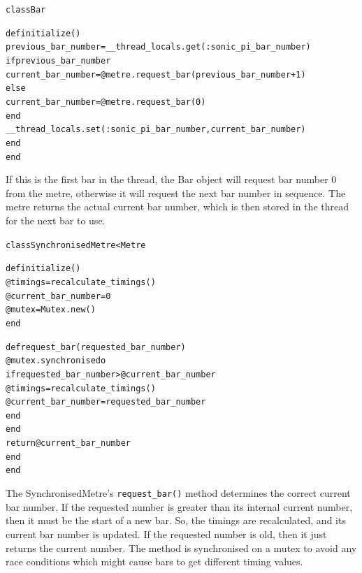 \documentclass[12pt,twoside,openright]{report}
\begin{document}
\begin{alltt}
class Bar

    def initialize()
        previous_bar_number = __thread_locals.get(:sonic_pi_bar_number)
        if previous_bar_number
            current_bar_number = @metre.request_bar(previous_bar_number + 1)
        else
            current_bar_number = @metre.request_bar(0)
        end
        __thread_locals.set(:sonic_pi_bar_number, current_bar_number)
    end
end
\end{alltt}

If this is the first bar in the thread, the Bar object will request bar number 0
from the metre, otherwise it will request the next bar number in sequence. The
metre returns the actual current bar number, which is then stored in the thread
for the next bar to use.

\begin{alltt}
class SynchronisedMetre < Metre

    def initialize()
        @timings = recalculate_timings()
        @current_bar_number = 0
        @mutex = Mutex.new()
    end

    def request_bar(requested_bar_number)
        @mutex.synchronise do
            if requested_bar_number > @current_bar_number
                @timings = recalculate_timings()
                @current_bar_number = requested_bar_number
            end
        end
        return @current_bar_number
    end
end
\end{alltt}

The SynchronisedMetre's \verb'request_bar()' method determines the correct current bar
number. If the requested number is greater than its internal current number,
then it must be the start of a new bar. So, the timings are recalculated, and
its current bar number is updated. If the requested number is old, then it just
returns the current number. The method is synchronised on a mutex to avoid any
race conditions which might cause bars to get different timing values.
\end{document}
